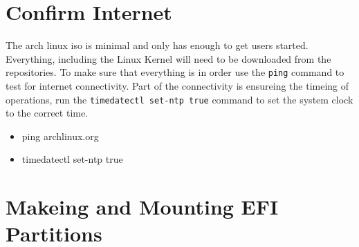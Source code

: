 \documentclass[10pt,letterpaper]{article}
\begin{document}
\section{Confirm Internet}

The arch linux iso is minimal and only has enough to get users started.
Everything, including the Linux Kernel will need to be downloaded from the
repositories. To make sure that everything is in order use the \texttt{ping}
command to test for internet connectivity. Part of the connectivity is
ensureing the timeing of operations, run the \texttt{timedatectl set-ntp true}
command to set the system clock to the correct time.
\begin{itemize}[noitemsep]
    \item ping archlinux.org
    \item timedatectl set-ntp true
\end{itemize}


\section{Makeing and Mounting EFI Partitions}
\end{document}
